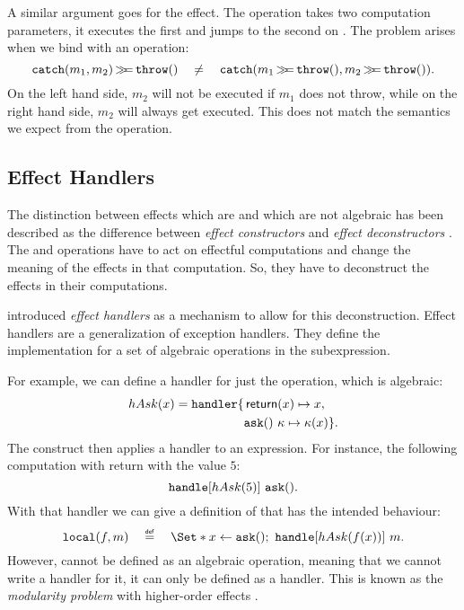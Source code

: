 A similar argument goes for the  effect. The \ocatch operation takes two computation parameters, it executes the first and jumps to the second on \othrow. The problem arises when we bind with an \othrow operation:
\[
    \mathtt{catch}(m_1, m_2) \operatorname{\mathtt{\gg\!\!=}} \mathtt{throw}() \quad\neq\quad \mathtt{catch}(m_1\operatorname{\mathtt{\gg\!\!=}}\mathtt{throw}(), m_2\operatorname{\mathtt{\gg\!\!=}}\mathtt{throw}()).
\]
On the left hand side, $m_2$ will not be executed if $m_1$ does not throw, while on the right hand side, $m_2$ will always get executed. This does not match the semantics we expect from the \ocatch operation.

\subsection{Effect Handlers}

The distinction between effects which are and which are not algebraic has been described as the difference between \emph{effect constructors} and \emph{effect deconstructors} \autocite{plotkin_algebraic_2003}. The \olocal and \ocatch operations have to act on effectful computations and change the meaning of the effects in that computation. So, they have to deconstruct the effects in their computations.

\textcite{castagna_handlers_2009} introduced \emph{effect handlers} as a mechanism to allow for this deconstruction. Effect handlers are a generalization of exception handlers. They define the implementation for a set of algebraic operations in the subexpression.

For example, we can define a handler for just the \oask operation, which is algebraic:
\[
    hAsk(x) = \mathbf{\mathtt{handler}} \{
        \begin{aligned}[t]
            &\operatorname{\mathsf{return}}(x) \mapsto x, \\
            &\mathtt{ask}()\ \kappa \mapsto \kappa(x) \}.\\
        \end{aligned}
\]
The \handle construct then applies a handler to an expression. For instance, the following computation with return with the value $5$:
\[
    \mathbf{\mathtt{handle}}[hAsk(5)]\ \mathtt{ask}().
\]
With that handler we can give a definition of \olocal that has the intended behaviour:
\[
    \olocal(f, m) \quad\defeq\quad \S{x \gets \oask()\seq \handle[hAsk(f(x))]\ m}.
\]
However, \olocal cannot be defined as an algebraic operation, meaning that we cannot write a handler for it, it can only be defined as a handler. This is known as the \emph{modularity problem} with higher-order effects \autocite{wu_effect_2014}.

